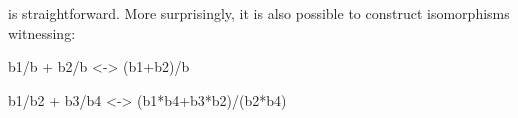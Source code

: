 \documentclass[preprint]{sigplanconf}
\begin{document}
is straightforward. More surprisingly, it is also possible to construct
isomorphisms witnessing:

{{b1/b + b2/b <-> (b1+b2)/b}}

{{b1/b2 + b3/b4 <-> (b1*b4+b3*b2)/(b2*b4) }}



\end{document}
